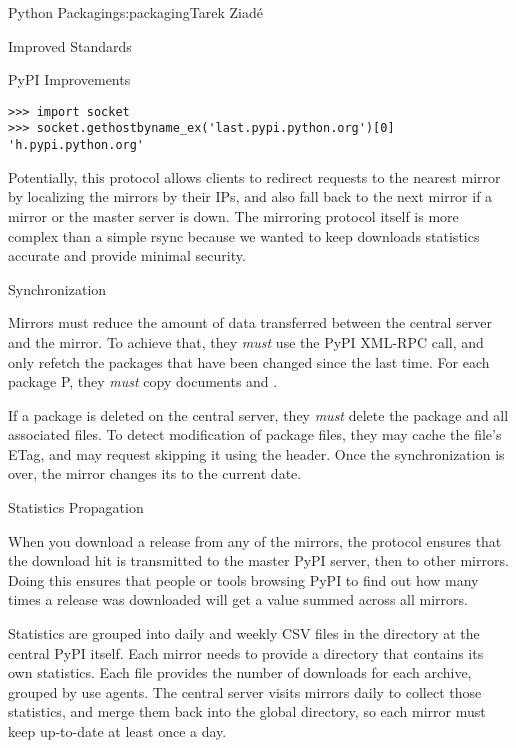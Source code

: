 \begin{aosachapter}{Python Packaging}{s:packaging}{Tarek Ziad\'{e}}
\begin{aosasect1}{Improved Standards}
\begin{aosasect2}{PyPI Improvements}
\begin{verbatim}
>>> import socket
>>> socket.gethostbyname_ex('last.pypi.python.org')[0]
'h.pypi.python.org'
\end{verbatim}

\noindent Potentially, this protocol allows clients to redirect requests to the
nearest mirror by localizing the mirrors by their IPs, and also fall
back to the next mirror if a mirror or the master server is down.  The
mirroring protocol itself is more complex than a simple rsync because
we wanted to keep downloads statistics accurate and provide minimal
security.

\begin{aosasect3}{Synchronization}

Mirrors must reduce the amount of data transferred between the central
server and the mirror. To achieve that, they \emph{must} use the
 PyPI XML-RPC call, and only refetch the packages that
have been changed since the last time.  For each package P, they
\emph{must} copy documents  and .

If a package is deleted on the central server, they \emph{must} delete
the package and all associated files. To detect modification of
package files, they may cache the file's ETag, and may request
skipping it using the  header.  Once the
synchronization is over, the mirror changes its 
to the current date.

\end{aosasect3}

\begin{aosasect3}{Statistics Propagation}

When you download a release from any of the mirrors, the protocol
ensures that the download hit is transmitted to the master PyPI
server, then to other mirrors.  Doing this ensures that people or
tools browsing PyPI to find out how many times a release was downloaded
will get a value summed across all mirrors.

Statistics are grouped into daily and weekly CSV files in the
 directory at the central PyPI itself.  Each mirror needs
to provide a  directory that contains its own
statistics. Each file provides the number of downloads for each
archive, grouped by use agents.  The central server visits mirrors
daily to collect those statistics, and merge them back into the global
 directory, so each mirror must keep 
up-to-date at least once a day.


\end{aosasect3}
\end{aosasect2}
\end{aosasect1}
\end{aosachapter}
